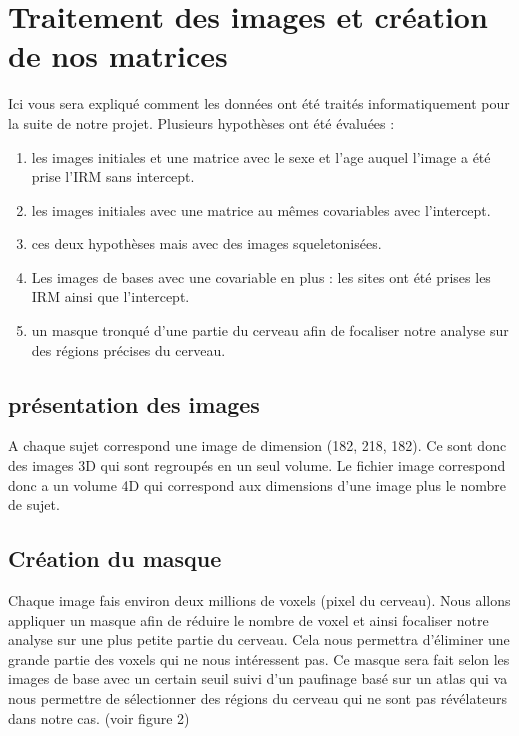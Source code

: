 \section{Traitement des images et création de nos matrices}

Ici vous sera expliqué comment les données ont été traités informatiquement pour la suite de notre projet.
Plusieurs hypothèses ont été évaluées : 
\begin{enumerate}
	\item les images initiales et une matrice avec le sexe et l'age auquel l'image a été prise l'IRM sans intercept.
	\item les images initiales avec une matrice au mêmes covariables avec l'intercept. 
	\item ces deux hypothèses mais avec des images squeletonisées.
	\item Les images de bases avec une covariable en plus : les sites ont été prises les IRM ainsi que l'intercept. 
	\item un masque tronqué d'une partie du cerveau afin de focaliser notre analyse sur des régions précises du cerveau.  
\end{enumerate}

\subsection{présentation des images}

A chaque sujet correspond une image de dimension (182, 218, 182). Ce sont donc des images 3D qui sont regroupés en un seul volume. Le fichier image correspond donc a un volume 4D qui correspond aux dimensions d'une image plus le nombre de sujet.

\subsection{Création du masque}

Chaque image fais environ deux millions de voxels (pixel du cerveau). Nous allons appliquer un masque afin de réduire le nombre de voxel et ainsi focaliser notre analyse sur une plus petite partie du cerveau. Cela nous permettra d'éliminer une grande partie des voxels qui ne nous intéressent pas. 
Ce masque sera fait selon les images de base avec un certain seuil suivi d'un paufinage basé sur un atlas qui va nous permettre de sélectionner des régions du cerveau qui ne sont pas révélateurs dans notre cas. (voir figure 2)

